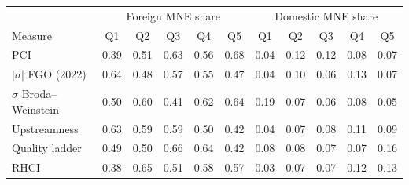 \begin{tabular}{lccccc|ccccc}
\toprule
 & \multicolumn{5}{c}{Foreign MNE share} & \multicolumn{5}{c}{Domestic MNE share} \\
Measure & Q1 & Q2 & Q3 & Q4 & Q5 & Q1 & Q2 & Q3 & Q4 & Q5 \\
\midrule
PCI & 0.39 & 0.51 & 0.63 & 0.56 & 0.68 & 0.04 & 0.12 & 0.12 & 0.08 & 0.07 \\
$|\sigma|$ FGO (2022) & 0.64 & 0.48 & 0.57 & 0.55 & 0.47 & 0.04 & 0.10 & 0.06 & 0.13 & 0.07 \\
$\sigma$ Broda--Weinstein & 0.50 & 0.60 & 0.41 & 0.62 & 0.64 & 0.19 & 0.07 & 0.06 & 0.08 & 0.05 \\
Upstreamness & 0.63 & 0.59 & 0.59 & 0.50 & 0.42 & 0.04 & 0.07 & 0.08 & 0.11 & 0.09 \\
Quality ladder & 0.49 & 0.50 & 0.66 & 0.64 & 0.42 & 0.08 & 0.08 & 0.07 & 0.07 & 0.16 \\
RHCI & 0.38 & 0.65 & 0.51 & 0.58 & 0.57 & 0.03 & 0.07 & 0.07 & 0.12 & 0.13 \\
\bottomrule
\end{tabular}
